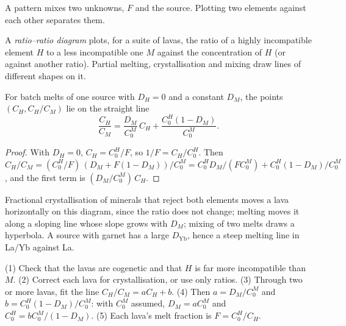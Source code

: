 A pattern mixes two unknowns, $F$ and the source. Plotting two elements
against each other separates them.

\begin{definition}\label{def:b3:trace-element-modelling:ratios}
A \emph{ratio--ratio diagram} plots, for a suite
of lavas, the ratio of a highly incompatible element $H$ to a less
incompatible one $M$ against the concentration of $H$ (or against another
ratio). Partial melting, crystallisation and mixing draw lines of different
shapes on it.
\end{definition}

\begin{proposition}\label{prop:b3:trace-element-modelling:line}
For batch melts of one source with $D_H = 0$ and a constant $D_M$, the points
$(C_H, C_H/C_M)$ lie on the straight line
\[
\frac{C_H}{C_M} = \frac{D_M}{C_0^M}\,C_H + \frac{C_0^H(1 - D_M)}{C_0^M}.
\]
\end{proposition}

\begin{proof}
With $D_H = 0$, $C_H = C_0^H/F$, so $1/F = C_H/C_0^H$. Then
$C_H/C_M = (C_0^H/F)\,(D_M + F(1 - D_M))/C_0^M = C_0^HD_M/(FC_0^M) +
C_0^H(1 - D_M)/C_0^M$, and the first term is $(D_M/C_0^M)\,C_H$.
\end{proof}

Fractional crystallisation of minerals that reject both elements moves a lava
horizontally on this diagram, since the ratio does not change; melting moves it
along a sloping line whose slope grows with $D_M$; mixing of two melts draws a
hyperbola. A source with garnet has a large $D_{\mathrm{Yb}}$, hence a steep
melting line in La/Yb against La.

\begin{method}\label{met:b3:trace-element-modelling:invert}
(1) Check that the lavas are cogenetic and that $H$ is far more incompatible
than $M$. (2) Correct each lava for crystallisation, or use only ratios.
(3) Through two or more lavas, fit the line $C_H/C_M = aC_H + b$. (4) Then
$a = D_M/C_0^M$ and $b = C_0^H(1 - D_M)/C_0^M$: with $C_0^M$ assumed, $D_M =
aC_0^M$ and $C_0^H = bC_0^M/(1 - D_M)$. (5) Each lava's melt fraction is
$F = C_0^H/C_H$.
\end{method}

